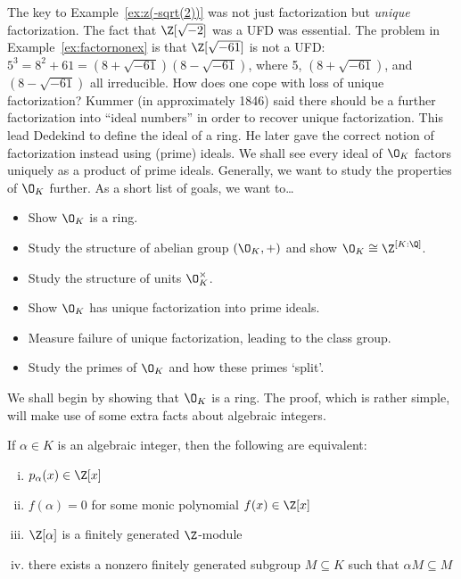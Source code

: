 The key to Example~\ref{ex:z(-sqrt(2))} was not just factorization but \emph{unique} factorization. The fact that $\Z[\sqrt{-2}]$ was a UFD was essential. The problem in Example~\ref{ex:factornonex} is that $\Z[\sqrt{-61}]$ is not a UFD: $5^3=8^2+61=(8+\sqrt{-61})(8-\sqrt{-61})$, where 5, $(8+\sqrt{-61})$, and $(8-\sqrt{-61})$ all irreducible. How does one cope with loss of unique factorization? Kummer (in approximately 1846) said there should be a further factorization into ``ideal numbers'' in order to recover unique factorization. This lead Dedekind to define the ideal of a ring. He later gave the correct notion of factorization instead using (prime) ideals. We shall see every ideal of $\O_K$ factors uniquely as a product of prime ideals. Generally, we want to study the properties of $\O_K$ further. As a short list of goals, we want to\dots
	\begin{itemize}
	\item Show $\O_K$ is a ring.
	\item Study the structure of abelian group $(\O_K,+)$ and show $\O_K \cong \Z^{[K:\Q]}$.
	\item Study the structure of units $\O_K^\times$.
	\item Show $\O_K$ has unique factorization into prime ideals.
	\item Measure failure of unique factorization, leading to the class group.
	\item Study the primes of $\O_K$ and how these primes `split'. 
	\end{itemize}


We shall begin by showing that $\O_K$ is a ring. The proof, which is rather simple, will make use of some extra facts about algebraic integers.

\begin{prop}\label{prop:algint}
If $\alpha \in K$ is an algebraic integer, then the following are equivalent:
	\begin{enumerate}[(i)]
	\item $p_\alpha(x) \in \Z[x]$
	\item $f(\alpha)=0$ for some monic polynomial $f(x) \in \Z[x]$
	\item $\Z[\alpha]$ is a finitely generated $\Z$-module
	\item there exists a nonzero finitely generated subgroup $M \subseteq K$ such that $\alpha M  \subseteq M$
	\end{enumerate}
\end{prop}

